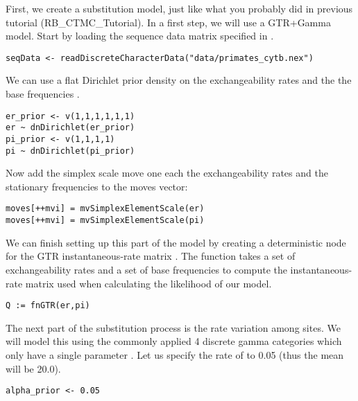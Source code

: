 First, we create a substitution model, just like what you probably did in previous tutorial (\EG RB\_CTMC\_Tutorial). 
In a first step, we will use a GTR+Gamma model.
Start by loading the sequence data matrix specified in .
{\tt \begin{snugshade*}
\begin{lstlisting}
seqData <- readDiscreteCharacterData("data/primates_cytb.nex")
\end{lstlisting}
\end{snugshade*}}
We can use a flat Dirichlet prior density on the exchangeability rates  and the the base frequencies .
{\tt \begin{snugshade*}
\begin{lstlisting}
er_prior <- v(1,1,1,1,1,1) 
er ~ dnDirichlet(er_prior)
pi_prior <- v(1,1,1,1) 
pi ~ dnDirichlet(pi_prior)
\end{lstlisting}
\end{snugshade*}}
Now add the simplex scale move one each the exchangeability rates  and the stationary frequencies  to the moves vector:
{\tt \small \begin{snugshade*}
\begin{lstlisting}
moves[++mvi] = mvSimplexElementScale(er) 
moves[++mvi] = mvSimplexElementScale(pi)  
\end{lstlisting}
\end{snugshade*}}
We can finish setting up this part of the model by creating a deterministic node for the GTR instantaneous-rate matrix . 
The  function takes a set of exchangeability rates and a set of base frequencies to compute the instantaneous-rate matrix used when calculating the likelihood of our model.
{\tt \begin{snugshade*}
\begin{lstlisting}
Q := fnGTR(er,pi)
\end{lstlisting}
\end{snugshade*}}
The next part of the substitution process is the rate variation among sites. We will model this using the commonly applied 4 discrete gamma categories which only have a single parameter .
Let us specify the rate of  to 0.05 (thus the mean will be 20.0).
{\tt\begin{snugshade*}
\begin{lstlisting}
alpha_prior <- 0.05                                                                             
\end{lstlisting}
\end{snugshade*}}
